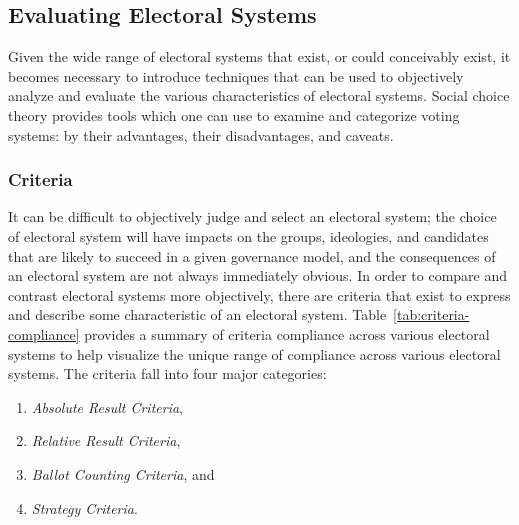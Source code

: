 \subsection{Evaluating Electoral Systems}\label{sec:electoral-criteria}
Given the wide range of electoral systems that exist, or could conceivably
exist, it becomes necessary to introduce techniques that can be used to
objectively analyze and evaluate the various characteristics of electoral
systems. Social choice theory provides tools which one can use to examine and
categorize voting systems: by their advantages, their disadvantages, and
caveats.


\subsubsection{Criteria}
It can be difficult to objectively judge and select an electoral system; the
choice of electoral system will have impacts on the groups, ideologies, and
candidates that are likely to succeed in a given governance model, and the
consequences of an electoral system are not always immediately obvious. In order
to compare and contrast electoral systems more objectively, there are criteria
that exist to express and describe some characteristic of an electoral system.
Table~\ref{tab:criteria-compliance} provides a summary of criteria compliance
across various electoral systems to help visualize the unique range of
compliance across various electoral systems. The criteria fall into four major
categories:

\begin{enumerate}
  \item \emph{Absolute Result Criteria},
  \item \emph{Relative Result Criteria},
  \item \emph{Ballot Counting Criteria}, and
  \item \emph{Strategy Criteria}.
\end{enumerate}


